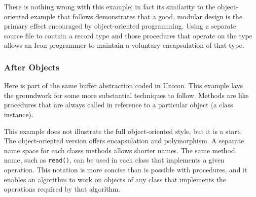 
There is nothing wrong with this example; in fact its similarity to the
object-oriented example that follows demonstrates that a good, modular
design is the primary effect encouraged by object-oriented programming. Using a separate source file
to contain a record type and those procedures that operate on the type
allows an Icon programmer to maintain a voluntary encapsulation of that
type. 

\subsubsection{After Objects}

Here is part of the same buffer abstraction coded in Unicon. This
example lays the groundwork for some more substantial techniques to
follow. Methods are like procedures that are always called in reference
to a particular object (a class instance).


This example does not illustrate the full object-oriented style, but it
is a start. The object-oriented version offers encapsulation and
polymorphism. A separate name space for each class{\textquotesingle}s
methods allows shorter names. The same method name, such as
\texttt{read()}, can be used in each class that
implements a given operation. This notation is more concise than is
possible with procedures, and it enables an algorithm to
work on objects of any class that implements the operations required by
that algorithm. 

